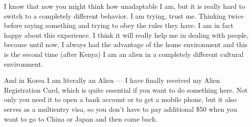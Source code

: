 \begin{post}
\begin{content}
I know that now you might think how unadaptable I am, but it is really hard to switch to a completely different behavior. I am trying, trust me. Thinking twice before saying something and trying to obey the rules they have. I am in fact happy about this experience. I think it will really help me in dealing with people, because until now, I always had the advantage of the home environment and this is the second time (after Kenya) I am an alien in a completely different cultural environment.

And in Korea I am literally an Alien --- I have finally received my Alien Registration Card, which is quite essential if you want to do something here. Not only you need it to open a bank account or to get a mobile phone, but it also serves as a multientry visa, so you don't have to pay additional \$50 when you want to go to China or Japan and then come back.


\end{content}
\end{post}
